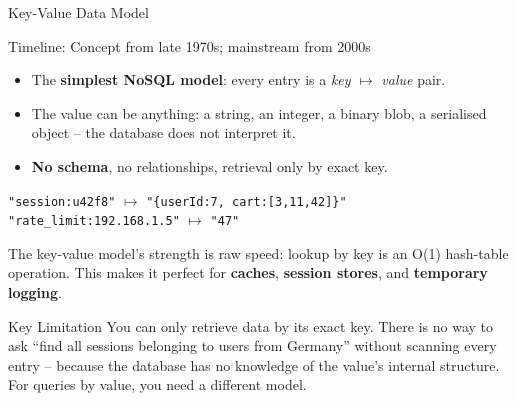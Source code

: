 \begin{frame}{Key-Value Data Model}
  \begin{block}{Timeline: Concept from late 1970s; mainstream from 2000s}
    \begin{itemize}
      \item The \textbf{simplest NoSQL model}: every entry is a
            \emph{key} $\mapsto$ \emph{value} pair.
      \item The value can be anything: a string, an integer, a binary blob,
            a serialised object -- the database does not interpret it.
      \item \textbf{No schema}, no relationships, retrieval only by exact key.
    \end{itemize}
  \end{block}

  \begin{examples}{}
    \texttt{"session:u42f8"} $\mapsto$ \texttt{"\{userId:7, cart:[3,11,42]\}"}\\
    \texttt{"rate\_limit:192.168.1.5"} $\mapsto$ \texttt{"47"}
  \end{examples}

  The key-value model's strength is raw speed: lookup by key is an O(1)
  hash-table operation.  This makes it perfect for \textbf{caches},
  \textbf{session stores}, and \textbf{temporary logging}.

  \begin{alertblock}{Key Limitation}
    You can only retrieve data by its exact key.  There is no way to ask
    ``find all sessions belonging to users from Germany'' without scanning
    every entry -- because the database has no knowledge of the value's
    internal structure.  For queries by value, you need a different model.
  \end{alertblock}
\end{frame}


